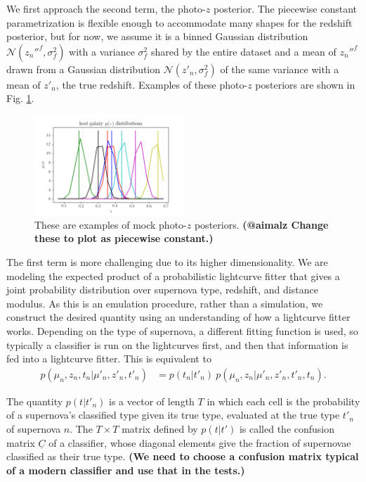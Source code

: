 \documentclass[12pt, onecolumn]{emulateapj}
\newcommand{\textul}{\underline}
\begin{document}
We first approach the second term, the photo-$z$ posterior.  The piecewise constant parametrization is flexible enough to accommodate many shapes for the redshift posterior, but for now, we assume it is a binned Gaussian distribution $\mathcal{N}(z_{n}''^{f}, \sigma_{f}^{2})$ with a variance $\sigma_{f}^{2}$ shared by the entire dataset and a mean of $z_{n}''^{f}$ drawn from a Gaussian distribution $\mathcal{N}(z'_{n}, \sigma_{f}^{2})$ of the same variance with a mean of $z'_{n}$, the true redshift.  Examples of these photo-$z$ posteriors are shown in Fig. \ref{fig:pzs}.

\begin{figure}
	\begin{center}
		\includegraphics[width=0.5\textwidth]{fig/host_likelihoods.png}
		\caption{These are examples of mock photo-$z$ posteriors.  \textbf{(@aimalz Change these to plot as piecewise constant.)}}
		\label{fig:pzs}
	\end{center}
\end{figure}

The first term is more challenging due to its higher dimensionality.  We are modeling the expected product of a probabilistic lightcurve fitter that gives a joint probability distribution over supernova type, redshift, and distance modulus.  As this is an emulation procedure, rather than a simulation, we construct the desired quantity using an understanding of how a lightcurve fitter works.  Depending on the type of supernova, a different fitting function is used, so typically a classifier is run on the lightcurves first, and then that information is fed into a lightcurve fitter.  This is equivalent to
\begin{align}
\label{eq:lc_fit_model}
p(\mu_{n}, z_{n}, t_{n} | \mu'_{n}, z'_{n}, t'_{n}) &= p(t_{n} | t'_{n})\ p(\mu_{n}, z_{n} | \mu'_{n}, z'_{n}, t'_{n}, t_{n}).
\end{align}

The quantity $p(t | t'_{n})$ is a vector of length $T$ in which each cell is the probability of a supernova's classified type given its true type, evaluated at the true type $t'_{n}$ of supernova $n$.  The $T\times T$ matrix defined by $p(t | t')$ is called the confusion matrix $\textul{C}$ of a classifier, whose diagonal elements give the fraction of supernovae classified as their true type.  \textbf{(We need to choose a confusion matrix typical of a modern classifier and use that in the tests.)}
\end{document}
